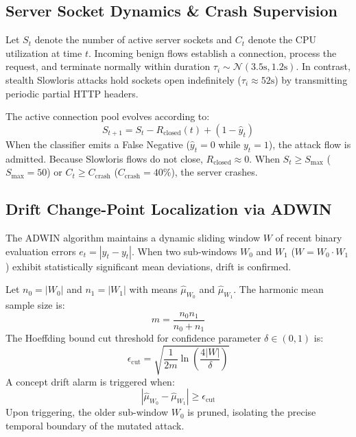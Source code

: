\documentclass[conference]{IEEEtran}
\begin{document}
\subsection{Server Socket Dynamics \& Crash Supervision}
Let $S_t$ denote the number of active server sockets and $C_t$ denote the CPU utilization at time $t$. Incoming benign flows establish a connection, process the request, and terminate normally within duration $\tau_i \sim \mathcal{N}(3.5\text{s}, 1.2\text{s})$. In contrast, stealth Slowloris attacks hold sockets open indefinitely ($\tau_i \approx 52\text{s}$) by transmitting periodic partial HTTP headers.

The active connection pool evolves according to:
\begin{equation}
S_{t+1} = S_t - R_{\text{closed}}(t) + (1 - \hat{y}_t)
\end{equation}
When the classifier emits a False Negative ($\hat{y}_t = 0$ while $y_t = 1$), the attack flow is admitted. Because Slowloris flows do not close, $R_{\text{closed}} \approx 0$. When $S_t \ge S_{\max}$ ($S_{\max}=50$) or $C_t \ge C_{\text{crash}}$ ($C_{\text{crash}}=40\%$), the server crashes.

\subsection{Drift Change-Point Localization via ADWIN}
The ADWIN algorithm \cite{bifet2007} maintains a dynamic sliding window $W$ of recent binary evaluation errors $e_t = |\hat{y}_t - y_t|$. When two sub-windows $W_0$ and $W_1$ ($W = W_0 \cdot W_1$) exhibit statistically significant mean deviations, drift is confirmed.

Let $n_0 = |W_0|$ and $n_1 = |W_1|$ with means $\hat{\mu}_{W_0}$ and $\hat{\mu}_{W_1}$. The harmonic mean sample size is:
\begin{equation}
m = \frac{n_0 n_1}{n_0 + n_1}
\end{equation}
The Hoeffding bound cut threshold for confidence parameter $\delta \in (0, 1)$ is:
\begin{equation}
\epsilon_{\text{cut}} = \sqrt{\frac{1}{2m} \ln\left(\frac{4|W|}{\delta}\right)}
\end{equation}
A concept drift alarm is triggered when:
\begin{equation}
|\hat{\mu}_{W_0} - \hat{\mu}_{W_1}| \ge \epsilon_{\text{cut}}
\end{equation}
Upon triggering, the older sub-window $W_0$ is pruned, isolating the precise temporal boundary of the mutated attack.
\end{document}
